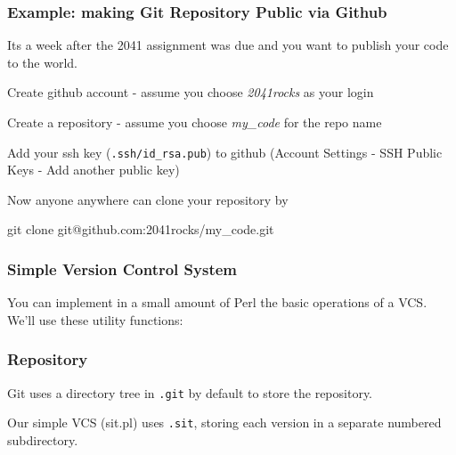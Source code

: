 \begin{frame}[fragile]
\frametitle{Example: making Git Repository Public via Github}

Its a week after the 2041 assignment was due and you want to publish your code to the world.

Create github account - assume you choose {\it{2041rocks}} as your login

Create a repository - assume you choose {\it{my\_code}} for the repo name

Add your ssh key ({\tt{.ssh/id\_rsa.pub}}) to github (Account Settings - SSH Public Keys - Add another public key)


Now anyone anywhere can clone your repository by 

\begin{sh}
git clone git@github.com:2041rocks/my_code.git
\end{sh}
\end{frame}

\begin{frame}
\frametitle{Simple Version Control System}

You can implement in a small amount of  Perl the  basic operations of a VCS.
We'll use these utility functions:

\begin{small}
\end{small}

\end{frame}

\begin{frame}
\frametitle{Repository}

Git uses a directory tree in {\tt .git} by default to store the repository.

Our simple VCS (sit.pl) uses {\tt .sit}, storing each version
in a separate numbered subdirectory.
\end{frame}


